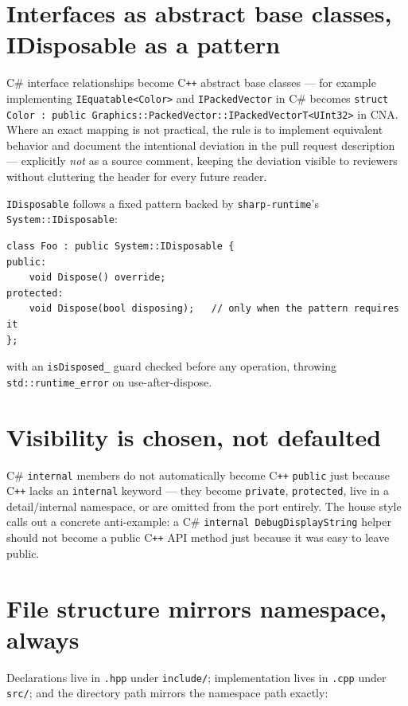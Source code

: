 \section{Interfaces as abstract base classes, IDisposable as a pattern}

C\# interface relationships become C\texttt{++} abstract base classes --- for example
 implementing \texttt{IEquatable<Color>} and \texttt{IPackedVector} in C\#
becomes \texttt{struct Color : public Graphics::PackedVector::IPackedVectorT<UInt32>} in
CNA. Where an exact mapping is not practical, the rule is to implement equivalent behavior
and document the intentional deviation in the pull request description --- explicitly
\emph{not} as a source comment, keeping the deviation visible to reviewers without cluttering
the header for every future reader.

\texttt{IDisposable} follows a fixed pattern backed by \texttt{sharp-runtime}'s
\texttt{System::IDisposable}:

\begin{lstlisting}
class Foo : public System::IDisposable {
public:
    void Dispose() override;
protected:
    void Dispose(bool disposing);   // only when the pattern requires it
};
\end{lstlisting}

with an \texttt{isDisposed\_} guard checked before any operation, throwing
\texttt{std::runtime\_error} on use-after-dispose.

\section{Visibility is chosen, not defaulted}

C\# \texttt{internal} members do not automatically become C\texttt{++} \texttt{public} just
because C\texttt{++} lacks an \texttt{internal} keyword --- they become \texttt{private},
\texttt{protected}, live in a detail/internal namespace, or are omitted from the port
entirely. The house style calls out a concrete anti-example: a C\# \texttt{internal
DebugDisplayString} helper should not become a public C\texttt{++} API method just because it
was easy to leave public.

\section{File structure mirrors namespace, always}

Declarations live in \texttt{.hpp} under \texttt{include/}; implementation lives in
\texttt{.cpp} under \texttt{src/}; and the directory path mirrors the namespace path exactly:

